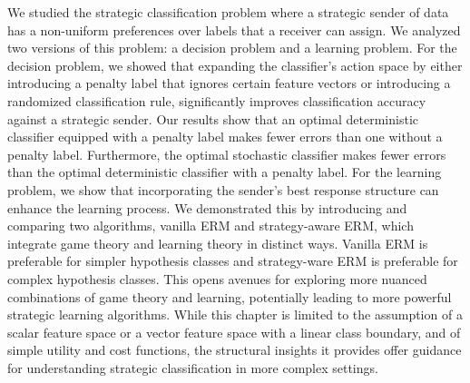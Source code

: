 We studied the strategic classification problem where a strategic sender of data
has a non-uniform preferences over labels that a receiver can assign. We analyzed two versions of this problem: a decision 
problem and a learning problem. For the decision problem, we showed that expanding the classifier’s action space by either introducing a 
penalty label that ignores certain feature vectors or introducing a randomized classification rule, 
significantly improves classification accuracy against a strategic sender. Our results show that an optimal deterministic classifier equipped with a penalty label makes fewer errors than one without a 
penalty label. Furthermore, the optimal stochastic classifier makes fewer errors than the optimal 
deterministic classifier with a penalty label.
For the learning problem, we show that incorporating the sender's best response structure can enhance the 
learning 
process. We demonstrated this by introducing and comparing two algorithms, vanilla ERM and strategy-aware ERM, which 
integrate game theory and 
learning theory in distinct ways. Vanilla ERM is preferable for simpler hypothesis classes and strategy-ware ERM is 
preferable for complex hypothesis classes. This opens avenues for exploring more nuanced combinations of game theory and learning, 
potentially leading to more powerful strategic learning algorithms. While this chapter is limited to the assumption of a 
scalar feature space or a vector feature space with a linear class boundary, and of simple utility and cost functions, 
the structural insights it provides offer guidance for understanding strategic classification in more complex settings.


